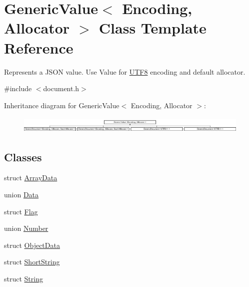 \hypertarget{class_generic_value}{}\section{Generic\+Value$<$ Encoding, Allocator $>$ Class Template Reference}
\label{class_generic_value}


Represents a J\+S\+ON value. Use Value for \hyperlink{struct_u_t_f8}{U\+T\+F8} encoding and default allocator.  




{\ttfamily \#include $<$document.\+h$>$}

Inheritance diagram for Generic\+Value$<$ Encoding, Allocator $>$\+:\begin{figure}[H]
\begin{center}
\leavevmode
\includegraphics[height=0.802292cm]{class_generic_value}
\end{center}
\end{figure}
\subsection*{Classes}
\begin{DoxyCompactItemize}
\item 
struct \hyperlink{struct_generic_value_1_1_array_data}{Array\+Data}
\item 
union \hyperlink{union_generic_value_1_1_data}{Data}
\item 
struct \hyperlink{struct_generic_value_1_1_flag}{Flag}
\item 
union \hyperlink{union_generic_value_1_1_number}{Number}
\item 
struct \hyperlink{struct_generic_value_1_1_object_data}{Object\+Data}
\item 
struct \hyperlink{struct_generic_value_1_1_short_string}{Short\+String}
\item 
struct \hyperlink{struct_generic_value_1_1_string}{String}
\end{DoxyCompactItemize}
